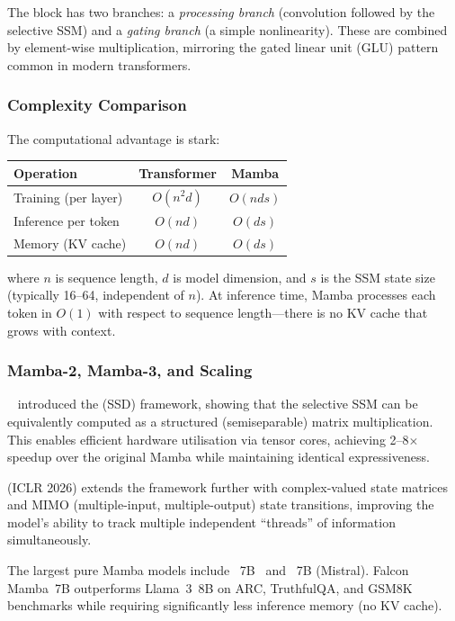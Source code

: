 The block has two branches: a \emph{processing branch} (convolution
followed by the selective SSM) and a \emph{gating branch} (a simple
nonlinearity). These are combined by element-wise multiplication,
mirroring the gated linear unit (GLU) pattern common in modern
transformers.

\subsubsection{Complexity Comparison}

The computational advantage is stark:

\begin{center}
\begin{tabular}{lcc}
\toprule
\textbf{Operation} & \textbf{Transformer} & \textbf{Mamba} \\
\midrule
Training (per layer) & $O(n^2 d)$ & $O(n d s)$ \\
Inference per token & $O(n d)$ & $O(d s)$ \\
Memory (KV cache) & $O(n d)$ & $O(d s)$ \\
\bottomrule
\end{tabular}
\end{center}

\noindent where $n$ is sequence length, $d$ is model dimension, and
$s$ is the SSM state size (typically 16--64, independent of $n$).
At inference time, Mamba processes each token in $O(1)$ with respect
to sequence length---there is no KV cache that grows with context.

\subsubsection{Mamba-2, Mamba-3, and Scaling}

~\cite{dao2024mamba2} introduced the
 (SSD) framework, showing that the
selective SSM can be equivalently computed as a structured
(semiseparable) matrix multiplication. This enables efficient hardware
utilisation via tensor cores, achieving 2--8$\times$ speedup over
the original Mamba while maintaining identical expressiveness.

 (ICLR 2026) extends the framework further with
complex-valued state matrices and MIMO (multiple-input,
multiple-output) state transitions, improving the model's ability
to track multiple independent ``threads'' of information
simultaneously.

The largest pure Mamba models include ~7B~\cite{zuo2024falcon} and ~7B
(Mistral). Falcon Mamba~7B outperforms Llama~3~8B on
ARC, TruthfulQA, and GSM8K benchmarks while requiring
significantly less inference memory (no KV cache).

